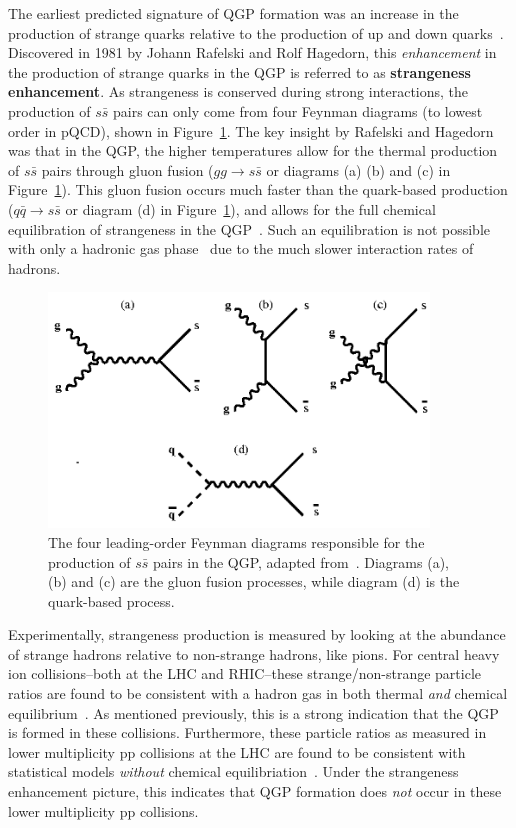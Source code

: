 The earliest predicted signature of QGP formation was an increase in the production of strange quarks relative to the production of up and down quarks~\cite{Strangeness}. Discovered in 1981 by Johann Rafelski and Rolf Hagedorn, this \textit{enhancement} in the production of strange quarks in the QGP is referred to as \textbf{strangeness enhancement}. As strangeness is conserved during strong interactions, the production of $s\bar{s}$ pairs can only come from four Feynman diagrams (to lowest order in pQCD), shown in Figure~\ref{fig:ssbar_production}. The key insight by Rafelski and Hagedorn was that in the QGP, the higher temperatures allow for the thermal production of $s\bar{s}$ pairs through gluon fusion ($gg \rightarrow s\bar{s}$ or diagrams (a) (b) and (c) in Figure~\ref{fig:ssbar_production}). This gluon fusion occurs much faster than the quark-based production ($q\bar{q} \rightarrow s\bar{s}$ or diagram (d) in Figure~\ref{fig:ssbar_production}), and allows for the full chemical equilibration of strangeness in the QGP~\cite{QGPEquil}. Such an equilibration is not possible with only a hadronic gas phase~\cite{HadronGasEquil} due to the much slower interaction rates of hadrons.

\begin{figure}[ht]
    \centering
    \includegraphics[width=0.9\textwidth]{figures/introduction/ssbar_production.png}
    \caption{The four leading-order Feynman diagrams responsible for the production of $s\bar{s}$ pairs in the QGP, adapted from~\cite{Strangeness}. Diagrams (a), (b) and (c) are the gluon fusion processes, while diagram (d) is the quark-based process.}
    \label{fig:ssbar_production}
\end{figure}

Experimentally, strangeness production is measured by looking at the abundance of strange hadrons relative to non-strange hadrons, like pions. For central heavy ion collisions--both at the LHC and RHIC--these strange/non-strange particle ratios are found to be consistent with a hadron gas in both thermal \textit{and} chemical equilibrium~\cite{NATURE12, NATURE13}. As mentioned previously, this is a strong indication that the QGP is formed in these collisions. Furthermore, these particle ratios as measured in lower multiplicity pp collisions at the LHC are found to be consistent with statistical models \textit{without} chemical equilibriation~\cite{NATURE14, NATURE15}. Under the strangeness enhancement picture, this indicates that QGP formation does \textit{not} occur in these lower multiplicity pp collisions. 

